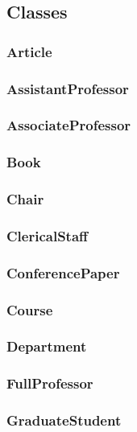 \documentclass{article}
\begin{document}
\subsection*{Classes}

\subsubsection*{Article}

\subsubsection*{AssistantProfessor}

\subsubsection*{AssociateProfessor}

\subsubsection*{Book}

\subsubsection*{Chair}

\subsubsection*{ClericalStaff}

\subsubsection*{ConferencePaper}

\subsubsection*{Course}

\subsubsection*{Department}

\subsubsection*{FullProfessor}

\subsubsection*{GraduateStudent}
\end{document}
